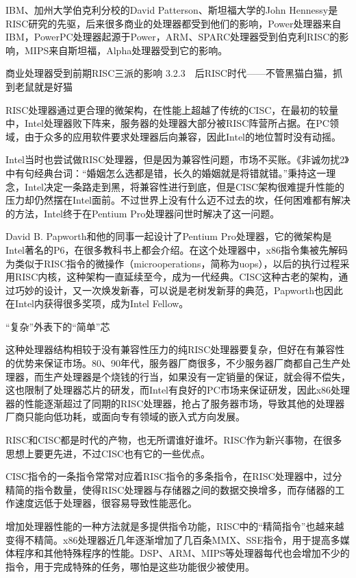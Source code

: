 \documentclass[12pt,UTF8]{ctexbook}
\begin{document}
IBM、加州大学伯克利分校的David Patterson、斯坦福大学的John Hennessy是RISC研究的先驱，后来很多商业的处理器都受到他们的影响，Power处理器来自IBM，PowerPC处理器起源于Power，ARM、SPARC处理器受到伯克利RISC的影响，MIPS来自斯坦福，Alpha处理器受到它的影响。

商业处理器受到前期RISC三派的影响
3.2.3　后RISC时代——不管黑猫白猫，抓到老鼠就是好猫

RISC处理器通过更合理的微架构，在性能上超越了传统的CISC，在最初的较量中，Intel处理器败下阵来，服务器的处理器大部分被RISC阵营所占据。在PC领域，由于众多的应用软件要求处理器后向兼容，因此Intel的地位暂时没有动摇。

Intel当时也尝试做RISC处理器，但是因为兼容性问题，市场不买账。《非诚勿扰2》中有句经典台词：“婚姻怎么选都是错，长久的婚姻就是将错就错。”秉持这一理念，Intel决定一条路走到黑，将兼容性进行到底，但是CISC架构很难提升性能的压力却仍然摆在Intel面前。不过世界上没有什么迈不过去的坎，任何困难都有解决的方法，Intel终于在Pentium Pro处理器问世时解决了这一问题。

David B. Papworth和他的同事一起设计了Pentium Pro处理器，它的微架构是Intel著名的P6，在很多教科书上都会介绍。在这个处理器中，x86指令集被先解码为类似于RISC指令的微操作（microoperations，简称为uops），以后的执行过程采用RISC内核，这种架构一直延续至今，成为一代经典。CISC这种古老的架构，通过巧妙的设计，又一次焕发新春，可以说是老树发新芽的典范，Papworth也因此在Intel内获得很多奖项，成为Intel Fellow。

“复杂”外表下的“简单”芯

这种处理器结构相较于没有兼容性压力的纯RISC处理器要复杂，但好在有兼容性的优势来保证市场。80、90年代，服务器厂商很多，不少服务器厂商都自己生产处理器，而生产处理器是个烧钱的行当，如果没有一定销量的保证，就会得不偿失，这也限制了处理器芯片的研发，而Intel有良好的PC市场来保证研发，因此x86处理器的性能逐渐超过了同期的RISC处理器，抢占了服务器市场，导致其他的处理器厂商只能向低功耗，或面向专有领域的嵌入式方向发展。

RISC和CISC都是时代的产物，也无所谓谁好谁坏。RISC作为新兴事物，在很多思想上要更先进，不过CISC也有它的一些优点。

CISC指令的一条指令常常对应着RISC指令的多条指令，在RISC处理器中，过分精简的指令数量，使得RISC处理器与存储器之间的数据交换增多，而存储器的工作速度远低于处理器，很容易导致性能恶化。

增加处理器性能的一种方法就是多提供指令功能，RISC中的“精简指令”也越来越变得不精简。x86处理器近几年逐渐增加了几百条MMX、SSE指令，用于提高多媒体程序和其他特殊程序的性能。DSP、ARM、MIPS等处理器每代也会增加不少的指令，用于完成特殊的任务，哪怕是这些功能很少被使用。
\end{document}
